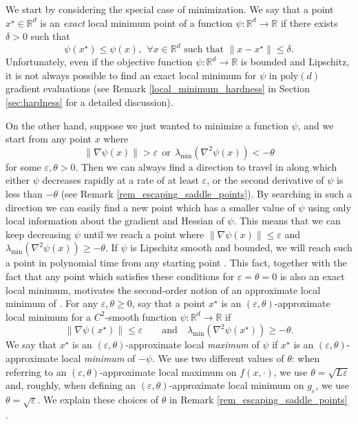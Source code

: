 \documentclass[11pt,letterpaper]{article}
\renewcommand{\epsilon}{\varepsilon}
\newcommand{\eps}{\varepsilon}
\begin{document}
\noindent
 We start by considering the special case of minimization.
%
 We say that a point $x^\star \in \mathbb{R}^d$  is an {\em exact} local minimum point of  a function  $\psi: \mathbb{R}^d \rightarrow \mathbb{R}$ if there exists $\delta>0$ such that 
\noindent
\begin{equation} \label{eq:ExactLocalMin_formal}
\psi(x^\star) \leq \psi(x), \ \  \forall x \in \mathbb{R}^d\textrm{ such that }\|x - x^\star \| \leq \delta.
\end{equation}
%
Unfortunately, even if the objective function $\psi:\mathbb{R}^d \rightarrow \mathbb{R}$ is bounded and Lipschitz, it is not always possible to find an exact local minimum for $\psi$ in $\mathrm{poly}(d)$ gradient evaluations (see Remark \ref{local_minimum_hardness} in Section \ref{sec:hardness} for a detailed discussion).

On the other hand, suppose we just wanted to minimize a function $\psi$, and we start from any point $x$ where $$\|\nabla \psi(x)\| > \epsilon \ \  \mbox{or} \ \   \lambda_{\mathrm{min}}( \nabla^2 \psi(x)) < -\theta$$ for some $\epsilon, \theta>0$.
%
%
Then we can always find a direction to travel in along which either $\psi$ decreases rapidly at a rate of at least $\epsilon$, or the second derivative of $\psi$ is less than $-\theta$ (see Remark \ref{rem_escaping_saddle_points}). 
%	
 By searching in such a direction we can easily find a new point which has a smaller value of $\psi$ using only local information about the gradient and Hessian of $\psi$.
 This means that we can keep decreasing $\psi$ until we reach a point where $\|\nabla \psi(x)\| \leq \epsilon$ and $\lambda_{\mathrm{min}}( \nabla^2 \psi(x)) \geq -\theta$.
  If $\psi$ is Lipschitz smooth and bounded, we will reach such a point in polynomial time from any starting point \cite{nesterov2006cubic, ge2015escaping}.
%
This fact, together with the fact that any point which satisfies these conditions for $\eps = \theta = 0$ is also an exact local minimum, motivates the second-order notion of an approximate local minimum of  \cite{nesterov2006cubic}. %
    For any $\epsilon, \theta \geq 0$, say that a point $x^\star$  is an $(\epsilon, \theta)$-approximate local minimum for  a $C^2$-smooth function $\psi: \mathbb{R}^d \rightarrow \mathbb{R}$ if
    \noindent
\begin{equation} \label{eq:ApproximateLocalMin_formal}
 \|\nabla \psi(x^\star)\| \leq \epsilon \qquad \mbox{and} \quad \lambda_{\mathrm{min}}( \nabla^2 \psi(x^\star)) \geq -\theta.
\end{equation}
%
 We say that $x^\star$ is an $(\epsilon, \theta)$-approximate local {\em maximum} of $\psi$ if  $x^\star$ is an $(\epsilon, \theta)$-approximate local {\em minimum} of $-\psi$.
%
%
 We use two different values of $\theta$: when referring to an $(\epsilon, \theta)$-approximate local maximum on $f(x,\cdot)$, we  use  $\theta = \sqrt{L_{} \epsilon}$ and, roughly, when defining an $(\epsilon, \theta)$-approximate local minimum on $g_\epsilon$, we  use  $\theta = \sqrt{\epsilon}$.  We explain these choices of $\theta$ in Remark  \ref{rem_escaping_saddle_points} .
\end{document}
